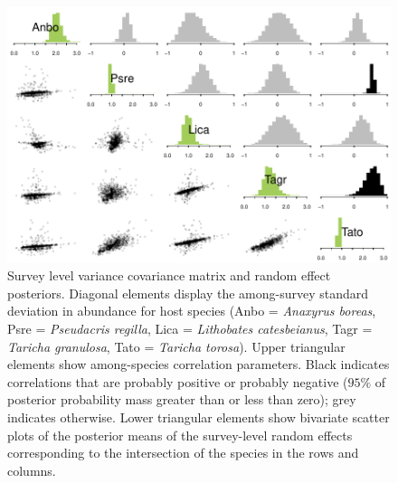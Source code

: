 \begin{figure}[ht]\centering
\includegraphics[width=\linewidth]{figs/ch4/amg_survey}
\caption[Survey level variance covariance matrix and random effect posteriors]{Survey level variance covariance matrix and random effect posteriors. Diagonal elements display the among-survey standard deviation in abundance for host species (Anbo = \textit{Anaxyrus boreas}, Psre = \textit{Pseudacris regilla}, Lica = \textit{Lithobates catesbeianus}, Tagr = \textit{Taricha granulosa}, Tato = \textit{Taricha torosa}). Upper triangular elements show among-species correlation parameters. Black indicates correlations that are probably positive or probably negative ($95\%$ of posterior probability mass greater than or less than zero); grey indicates otherwise. Lower triangular elements show bivariate scatter plots of the posterior means of the survey-level random effects corresponding to the intersection of the species in the rows and columns.}
\label{fig:amg_survey}
\end{figure}

